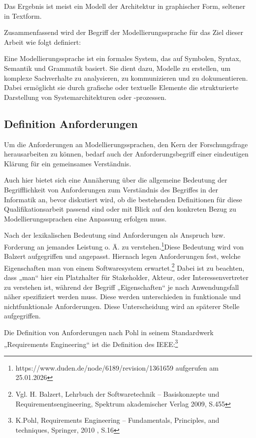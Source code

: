 Das Ergebnis ist meist ein Modell der Architektur in graphischer Form, seltener in Textform.

Zusammenfassend wird der Begriff der Modellierungssprache für das Ziel dieser Arbeit wie folgt definiert: 

Eine Modellierungssprache ist ein formales System, das auf Symbolen, Syntax, Semantik und Grammatik basiert. Sie dient dazu, Modelle zu erstellen, um komplexe Sachverhalte zu analysieren, zu kommunizieren und zu dokumentieren. Dabei ermöglicht sie durch grafische oder textuelle Elemente die strukturierte Darstellung von Systemarchitekturen oder -prozessen.



\subsection{Definition Anforderungen}


Um die Anforderungen an Modellierungssprachen, den Kern der Forschungsfrage herausarbeiten zu können, bedarf auch der Anforderungsbegriff einer eindeutigen Klärung für ein gemeinsames Verständnis. 

Auch hier bietet sich eine Annäherung über die allgemeine Bedeutung der Begrifflichkeit von Anforderungen zum Verständnis des Begriffes in der Informatik an, bevor diskutiert wird, ob die bestehenden Definitionen für diese Qualifikationsarbeit passend sind oder mit Blick auf den konkreten Bezug zu Modellierungssprachen eine Anpassung erfolgen muss.

Nach der lexikalischen Bedeutung sind Anforderungen als Anspruch bzw. Forderung an jemandes Leistung o. Ä. zu verstehen.\footnote{https://www.duden.de/node/6189/revision/1361659 aufgerufen am 25.01.2026}Diese Bedeutung wird von Balzert aufgegriffen und angepasst. Hiernach legen Anforderungen fest, welche Eigenschaften man von einem Softwaresystem erwartet.\footnote{Vgl. H. Balzert, Lehrbuch der Softwaretechnik – Basiskonzepte und Requirementsengineering, Spektrum akademischer Verlag 2009, S.455} Dabei ist zu beachten, dass „man“ hier ein Platzhalter für Stakeholder, Akteur, oder Interessenvertreter zu verstehen ist, während der Begriff „Eigenschaften“ je nach Anwendungsfall näher spezifiziert werden muss. Diese werden unterschieden in funktionale und nichtfunktionale Anforderungen. Diese Unterscheidung wird an späterer Stelle aufgegriffen.

Die Definition von Anforderungen nach Pohl in seinem Standardwerk „Requirements Engineering“ ist die Definition des IEEE:\footnote{K.Pohl, Requirements Engineering – Fundamentals, Principles, and techniques, Springer, 2010 , S.16}

